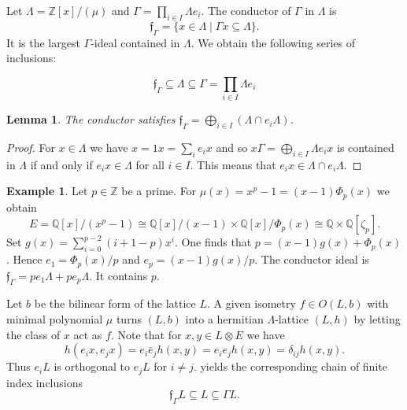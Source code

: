 \documentclass[a4paper]{amsart}
\theoremstyle{definition}
\newtheorem{example}[definition]{Example}
\theoremstyle{plain}
\newtheorem{lemma}[definition]{Lemma}
\newcommand{\QQ}{\mathbb{Q}}
\newcommand{\ZZ}{\mathbb{Z}}
\begin{document}
Let $\Lambda = \ZZ[x]/(\mu)$ and $\Gamma = \prod_{i \in I} \Lambda e_i$.
The conductor of $\Gamma$ in $\Lambda$ is
\[\mathfrak{f}_\Gamma= \{x \in \Lambda \mid \Gamma x \subseteq \Lambda\}.\]
It is the largest $\Gamma$-ideal contained in $\Lambda$.
We obtain the following series of inclusions:

 \begin{equation}\label{eqn:sandwich_ring}
 \mathfrak{f}_{\Gamma} \subseteq \Lambda \subseteq \Gamma = \prod_{i\in I} \Lambda e_i
 \end{equation}

%
%
%
%
%
%
%
\begin{lemma}
 The conductor satisfies $\mathfrak{f}_\Gamma = \bigoplus_{i \in I} (\Lambda \cap e_i \Lambda)$.
\end{lemma}

\begin{proof}
  For $x \in \Lambda$ we have $x = 1 x = \sum_i e_i x$ and so $x \Gamma = \bigoplus_{i \in I} \Lambda e_i x$ is contained in $\Lambda$ if and only if $e_i x \in \Lambda$ for all $i\in I$. This means that $e_i x \in \Lambda \cap e_i \Lambda$.
\end{proof}

\begin{example}\label{ex:conductor}
 Let $p \in \ZZ$ be a prime. For $\mu(x) = x^p-1 = (x-1)\Phi_p(x)$
 we obtain
 \[E = \QQ[x] / (x^p-1) \cong \QQ[x]/(x-1) \times \QQ[x]/\Phi_p(x) \cong \QQ \times \QQ[\zeta_p].\]
 Set $g(x) = \sum_{i=0}^{p-2}(i+1-p)x^i$.
 One finds that $p = (x-1)g(x) + \Phi_p(x)$.
 Hence $e_1=\Phi_p(x)/p$ and $e_p = (x-1)g(x)/p$.
 The conductor ideal is $\mathfrak{f}_\Gamma=p e_1 \Lambda + p e_p \Lambda$. It contains $p$.
\end{example}
Let $b$ be the bilinear form of the lattice $L$.
A given isometry $f\in O(L,b)$ with minimal polynomial $\mu$
turns $(L,b)$ into a hermitian $\Lambda$-lattice $(L,h)$ by letting the class of $x$ act as $f$.
Note that for $x,y \in L\otimes E$ we have
\[h(e_i x, e_j x) = e_i \bar e_j h(x,y) = e_i e_j h(x,y) = \delta_{ij} h(x,y).\]
Thus $e_i L$ is orthogonal to $e_j L$ for $i\neq j$.
yields the corresponding chain of finite index inclusions
\begin{equation}\label{eqn:sandwich}
\mathfrak{f}_{\Gamma}L \subseteq L \subseteq \Gamma L.
\end{equation}
\end{document}
